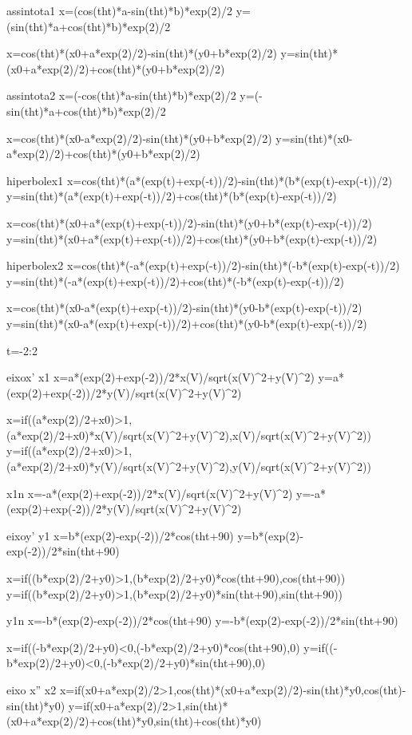 

assintota1
x=(cos(tht)*a-sin(tht)*b)*exp(2)/2
y=(sin(tht)*a+cos(tht)*b)*exp(2)/2


x=cos(tht)*(x0+a*exp(2)/2)-sin(tht)*(y0+b*exp(2)/2)
y=sin(tht)*(x0+a*exp(2)/2)+cos(tht)*(y0+b*exp(2)/2)


assintota2
x=(-cos(tht)*a-sin(tht)*b)*exp(2)/2
y=(-sin(tht)*a+cos(tht)*b)*exp(2)/2

x=cos(tht)*(x0-a*exp(2)/2)-sin(tht)*(y0+b*exp(2)/2)
y=sin(tht)*(x0-a*exp(2)/2)+cos(tht)*(y0+b*exp(2)/2)


hiperbolex1
x=cos(tht)*(a*(exp(t)+exp(-t))/2)-sin(tht)*(b*(exp(t)-exp(-t))/2)
y=sin(tht)*(a*(exp(t)+exp(-t))/2)+cos(tht)*(b*(exp(t)-exp(-t))/2)


x=cos(tht)*(x0+a*(exp(t)+exp(-t))/2)-sin(tht)*(y0+b*(exp(t)-exp(-t))/2)
y=sin(tht)*(x0+a*(exp(t)+exp(-t))/2)+cos(tht)*(y0+b*(exp(t)-exp(-t))/2)


hiperbolex2
x=cos(tht)*(-a*(exp(t)+exp(-t))/2)-sin(tht)*(-b*(exp(t)-exp(-t))/2)
y=sin(tht)*(-a*(exp(t)+exp(-t))/2)+cos(tht)*(-b*(exp(t)-exp(-t))/2)


x=cos(tht)*(x0-a*(exp(t)+exp(-t))/2)-sin(tht)*(y0-b*(exp(t)-exp(-t))/2)
y=sin(tht)*(x0-a*(exp(t)+exp(-t))/2)+cos(tht)*(y0-b*(exp(t)-exp(-t))/2)


t=-2:2

eixox'
x1
x=a*(exp(2)+exp(-2))/2*x(V)/sqrt(x(V)^2+y(V)^2)
y=a*(exp(2)+exp(-2))/2*y(V)/sqrt(x(V)^2+y(V)^2)

x=if((a*exp(2)/2+x0)>1,(a*exp(2)/2+x0)*x(V)/sqrt(x(V)^2+y(V)^2),x(V)/sqrt(x(V)^2+y(V)^2))
y=if((a*exp(2)/2+x0)>1,(a*exp(2)/2+x0)*y(V)/sqrt(x(V)^2+y(V)^2),y(V)/sqrt(x(V)^2+y(V)^2))

x1n
x=-a*(exp(2)+exp(-2))/2*x(V)/sqrt(x(V)^2+y(V)^2)
y=-a*(exp(2)+exp(-2))/2*y(V)/sqrt(x(V)^2+y(V)^2)

eixoy'
y1
x=b*(exp(2)-exp(-2))/2*cos(tht+90)
y=b*(exp(2)-exp(-2))/2*sin(tht+90)

x=if((b*exp(2)/2+y0)>1,(b*exp(2)/2+y0)*cos(tht+90),cos(tht+90))
y=if((b*exp(2)/2+y0)>1,(b*exp(2)/2+y0)*sin(tht+90),sin(tht+90))

y1n
x=-b*(exp(2)-exp(-2))/2*cos(tht+90)
y=-b*(exp(2)-exp(-2))/2*sin(tht+90)

x=if((-b*exp(2)/2+y0)<0,(-b*exp(2)/2+y0)*cos(tht+90),0)
y=if((-b*exp(2)/2+y0)<0,(-b*exp(2)/2+y0)*sin(tht+90),0)


eixo x''
x2
x=if(x0+a*exp(2)/2>1,cos(tht)*(x0+a*exp(2)/2)-sin(tht)*y0,cos(tht)-sin(tht)*y0)
y=if(x0+a*exp(2)/2>1,sin(tht)*(x0+a*exp(2)/2)+cos(tht)*y0,sin(tht)+cos(tht)*y0)

